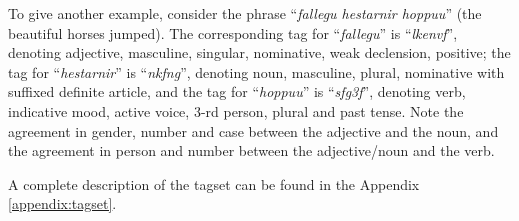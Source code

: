 \documentclass[11pt]{article}
\begin{document}
To give another example, consider the phrase ``\emph{fallegu hestarnir hoppu{\dh}u}'' (the beautiful horses jumped).
The corresponding tag for ``\emph{fallegu}'' is ``\emph{lkenvf}'', denoting adjective, masculine, singular, nominative, weak declension, positive;
the tag for ``\emph{hestarnir}'' is ``\emph{nkfng}'', denoting noun, masculine, plural, nominative with suffixed definite article, and the tag for ``\emph{hoppu{\dh}u}'' is ``\emph{sfg3f{\th}}'', denoting verb, indicative mood, active voice, 3-rd person, plural and past tense.
Note the agreement in gender, number and case between the adjective and the noun, and the agreement in person and number between the adjective/noun and the verb.

A complete description of the tagset can be found in the Appendix \ref{appendix:tagset}.

\begin{spacing}{1.0}


\end{spacing}
\end{document}
